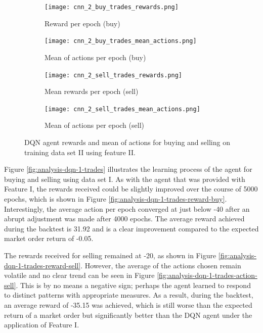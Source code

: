 \begin{figure}[H]
    \centering
    \begin{subfigure}[b]{0.45\textwidth}
        \texttt{[image: cnn\_2\_buy\_trades\_rewards.png]}
        \caption{Reward per epoch (buy)}
        \label{fig:analysis-dqn-2-trades-reward-buy}
    \end{subfigure}
    \begin{subfigure}[b]{0.45\textwidth}
        \texttt{[image: cnn\_2\_buy\_trades\_mean\_actions.png]}
        \caption{Mean of actions per epoch (buy)}
        \label{fig:analysis-dqn-2-trades-action-buy}
    \end{subfigure}
    \begin{subfigure}[b]{0.45\textwidth}
        \texttt{[image: cnn\_2\_sell\_trades\_rewards.png]}
        \caption{Mean rewards per epoch (sell)}
        \label{fig:analysis-dqn-2-trades-reward-sell}
    \end{subfigure}
    \begin{subfigure}[b]{0.45\textwidth}
        \texttt{[image: cnn\_2\_sell\_trades\_mean\_actions.png]}
        \caption{Mean of actions per epoch (sell)}
        \label{fig:analysis-dqn-2-trades-action-sell}
    \end{subfigure}
    \caption{DQN agent rewards and mean of actions for buying and selling on training data set II using feature II.}
    \label{fig:analysis-dqn-2-trades}
\end{figure}

Figure \ref{fig:analysis-dqn-1-trades} illustrates the learning process of the agent for buying and selling using data set I.
As with the agent that was provided with Feature I, the rewards received could be slightly improved over the course of 5000 epochs, which is shown in Figure \ref{fig:analysis-dqn-1-trades-reward-buy}.
Interestingly, the average action per epoch converged at just below -40 after an abrupt adjustment was made after 4000 epochs.
The average reward achieved during the backtest is 31.92 and is a clear improvement compared to the expected market order return of -0.05.

The rewards received for selling remained at -20, as shown in Figure \ref{fig:analysis-dqn-1-trades-reward-sell}.
However, the average of the actions chosen remain volatile and no clear trend can be seen in Figure \ref{fig:analysis-dqn-1-trades-action-sell}.
This is by no means a negative sign; perhaps the agent learned to respond to distinct patterns with appropriate measures.
As a result, during the backtest, an average reward of -35.15 was achieved, which is still worse than the expected return of a market order but significantly better than the DQN agent under the application of Feature I.

